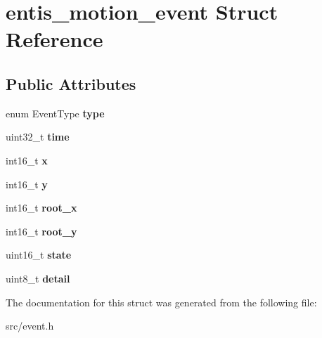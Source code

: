 \hypertarget{structentis__motion__event}{}\section{entis\+\_\+motion\+\_\+event Struct Reference}
\label{structentis__motion__event}
\subsection*{Public Attributes}
\begin{DoxyCompactItemize}
\item 
\mbox{\label{structentis__motion__event_aaea170b933103f0846b91d9a1bb267f8}} 
enum Event\+Type {\bfseries type}
\item 
\mbox{\label{structentis__motion__event_a8821fe76a2f53de2e61688d73428978a}} 
uint32\+\_\+t {\bfseries time}
\item 
\mbox{\label{structentis__motion__event_a543febabcd244b05514b6a880543e464}} 
int16\+\_\+t {\bfseries x}
\item 
\mbox{\label{structentis__motion__event_a05b9d879be66a647aa41af0382557da3}} 
int16\+\_\+t {\bfseries y}
\item 
\mbox{\label{structentis__motion__event_af7f8bfe48c36677cab924cbaa8672b4f}} 
int16\+\_\+t {\bfseries root\+\_\+x}
\item 
\mbox{\label{structentis__motion__event_a48823230db1d43e51c791520eb88b794}} 
int16\+\_\+t {\bfseries root\+\_\+y}
\item 
\mbox{\label{structentis__motion__event_a093c1cd2b716bdb6e39625f05c372ef3}} 
uint16\+\_\+t {\bfseries state}
\item 
\mbox{\label{structentis__motion__event_a2bef24cfdce6f3ed754de366ab94e31e}} 
uint8\+\_\+t {\bfseries detail}
\end{DoxyCompactItemize}


The documentation for this struct was generated from the following file\+:\begin{DoxyCompactItemize}
\item 
src/event.\+h\end{DoxyCompactItemize}
